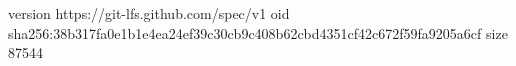 version https://git-lfs.github.com/spec/v1
oid sha256:38b317fa0e1b1e4ea24ef39c30cb9c408b62cbd4351cf42c672f59fa9205a6cf
size 87544
